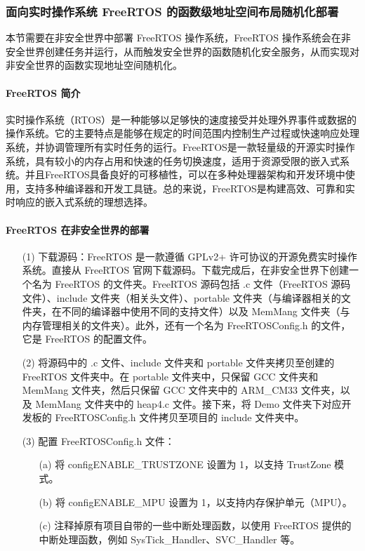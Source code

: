 \documentclass[12pt,a4paper]{ctexart}
\numberwithin{figure}{section}
\begin{document}
\subsubsection{面向实时操作系统 FreeRTOS 的函数级地址空间布局随机化部署}
\par 本节需要在非安全世界中部署 FreeRTOS 操作系统，FreeRTOS 操作系统会在非安全世界创建任务并运行，从而触发安全世界的函数随机化安全服务，从而实现对非安全世界的函数实现地址空间随机化。
\paragraph{FreeRTOS 简介}
\par 实时操作系统（RTOS）是一种能够以足够快的速度接受并处理外界事件或数据的操作系统。它的主要特点是能够在规定的时间范围内控制生产过程或快速响应处理系统，并协调管理所有实时任务的运行。FreeRTOS是一款轻量级的开源实时操作系统，具有较小的内存占用和快速的任务切换速度，适用于资源受限的嵌入式系统。并且FreeRTOS具备良好的可移植性，可以在多种处理器架构和开发环境中使用，支持多种编译器和开发工具链。总的来说，FreeRTOS是构建高效、可靠和实时响应的嵌入式系统的理想选择。
\paragraph{FreeRTOS 在非安全世界的部署}
\begin{itemize}
    \item[(1)] 下载源码：FreeRTOS 是一款遵循 GPLv2+ 许可协议的开源免费实时操作系统。直接从 FreeRTOS 官网下载源码。下载完成后，在非安全世界下创建一个名为 FreeRTOS 的文件夹。FreeRTOS 源码包括 .c 文件（FreeRTOS 源码文件）、include 文件夹（相关头文件）、portable 文件夹（与编译器相关的文件夹，在不同的编译器中使用不同的支持文件）以及 MemMang 文件夹（与内存管理相关的文件夹）。此外，还有一个名为 FreeRTOSConfig.h 的文件，它是 FreeRTOS 的配置文件。

    \item[(2)] 将源码中的 .c 文件、include 文件夹和 portable 文件夹拷贝至创建的 FreeRTOS 文件夹中。在 portable 文件夹中，只保留 GCC 文件夹和 MemMang 文件夹，然后只保留 GCC 文件夹中的 ARM\_CM33 文件夹，以及 MemMang 文件夹中的 heap4.c 文件。接下来，将 Demo 文件夹下对应开发板的 FreeRTOSConfig.h 文件拷贝至项目的 include 文件夹中。

    \item[(3)] 配置 FreeRTOSConfig.h 文件：
        \begin{itemize}
            \item[(a)] 将 configENABLE\_TRUSTZONE 设置为 1，以支持 TrustZone 模式。
            \item[(b)] 将 configENABLE\_MPU 设置为 1，以支持内存保护单元（MPU）。
            \item[(c)] 注释掉原有项目自带的一些中断处理函数，以使用 FreeRTOS 提供的中断处理函数，例如 SysTick\_Handler、SVC\_Handler 等。
        \end{itemize}
\end{itemize}
\end{document}
